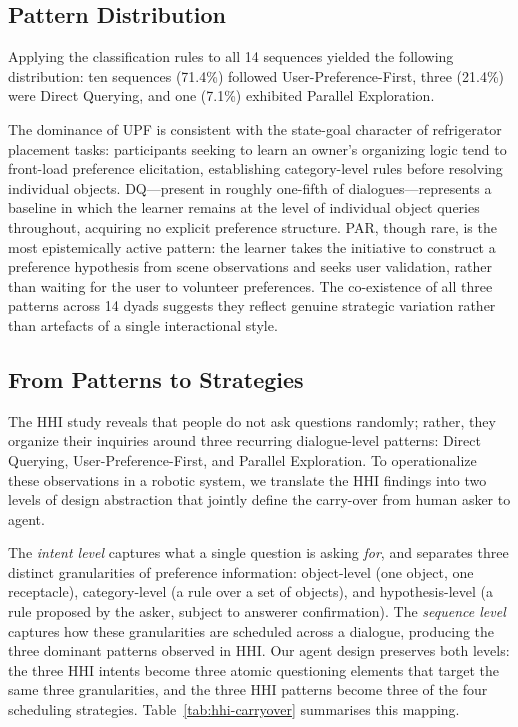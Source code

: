 \documentclass[manuscript,review,anonymous]{acmart}
\begin{document}
\subsection{Pattern Distribution}

Applying the classification rules to all 14 sequences yielded the following distribution: ten sequences (71.4\%) followed User-Preference-First, three (21.4\%) were Direct Querying, and one (7.1\%) exhibited Parallel Exploration.

The dominance of UPF is consistent with the state-goal character of refrigerator placement tasks: participants seeking to learn an owner's organizing logic tend to front-load preference elicitation, establishing category-level rules before resolving individual objects. DQ---present in roughly one-fifth of dialogues---represents a baseline in which the learner remains at the level of individual object queries throughout, acquiring no explicit preference structure. PAR, though rare, is the most epistemically active pattern: the learner takes the initiative to construct a preference hypothesis from scene observations and seeks user validation, rather than waiting for the user to volunteer preferences. The co-existence of all three patterns across 14 dyads suggests they reflect genuine strategic variation rather than artefacts of a single interactional style.

\subsection{From Patterns to Strategies}

The HHI study reveals that people do not ask questions randomly; rather, they organize their inquiries around three recurring dialogue-level patterns: Direct Querying, User-Preference-First, and Parallel Exploration. To operationalize these observations in a robotic system, we translate the HHI findings into two levels of design abstraction that jointly define the carry-over from human asker to agent.

The \textit{intent level} captures what a single question is asking \textit{for}, and separates three distinct granularities of preference information: object-level (one object, one receptacle), category-level (a rule over a set of objects), and hypothesis-level (a rule proposed by the asker, subject to answerer confirmation). The \textit{sequence level} captures how these granularities are scheduled across a dialogue, producing the three dominant patterns observed in HHI. Our agent design preserves both levels: the three HHI intents become three atomic questioning elements that target the same three granularities, and the three HHI patterns become three of the four scheduling strategies. Table~\ref{tab:hhi-carryover} summarises this mapping.
\end{document}

